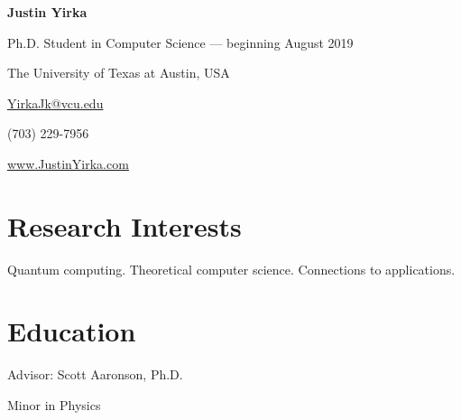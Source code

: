 \documentclass[11pt,letterpaper,serif]{moderncv}
\begin{document}
	
	
\thispagestyle{firstpage}

\begin{center}
	{\huge\textbf{Justin Yirka}}
	
	Ph.D. Student in Computer Science --- beginning August 2019
	
	The University of Texas at Austin, USA
	
	\vspace{\baselineskip}
	
	\href{mailto:yirkajk@vcu.edu}{YirkaJk@vcu.edu}
	
	(703) 229-7956
	
	\url{www.JustinYirka.com}	
\end{center}


\setlength{\parskip}{0.4em}

\section{Research Interests}
Quantum computing. Theoretical computer science. Connections to applications.


\section{Education}
{
	\normalsize
	\begin{adjustwidth}{.25in}{}
		 Advisor: Scott Aaronson, Ph.D.
	\end{adjustwidth}
}

\vspace{-\baselineskip}\vspace{-2\parskip}
{%
}
{
	\begin{adjustwidth}{.25in}{}
		Minor in Physics %
	\end{adjustwidth}
}
\end{document}
